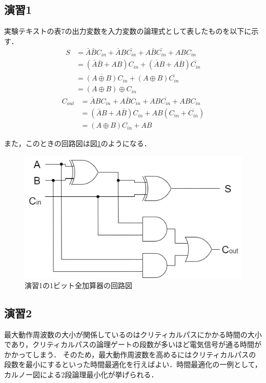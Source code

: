 \documentclass{jlreq}
\numberwithin{equation}{section}
\begin{document}
\subsection{演習1}
実験テキストの表7の出力変数を入力変数の論理式として表したものを以下に示す．
\begin{align}
  S & = \bar{A} \bar{B} C_{in} + \bar{A} B \bar{C_{in}} + A \bar{B} \bar{C_{in}} + A B C_{in} \\
    & = (\bar{A}\bar{B} + AB)C_{in} + (\overline{A}B + A\overline{B})\overline{C_{in}}        \\
    & = \overline{(A \oplus B)}C_{in} + (A \oplus B)\overline{C_{in}}                         \\
    & = (A \oplus B) \oplus C_{in}
\end{align}
\begin{align}
  C_{out} & = \bar{A} B C_{in} + A \bar{B} C_{in} + A B \overline{C_{in}} + A B C_{in} \\
          & = (\bar{A} B + A \bar{B})C_{in} + AB(C_{in} + \overline{C_{in}})           \\
          & = (A \oplus B)C_{in} + AB
\end{align}

また，このときの回路図は図\ref{fig:enshu1}のようになる．
\begin{figure}[H]
  \centering
  \includegraphics[width=\textwidth]{assets/enshu1.png}
  \caption{演習1の1ビット全加算器の回路図}
  \label{fig:enshu1}
\end{figure}

\subsection{演習2}
最大動作周波数の大小が関係しているのはクリティカルパスにかかる時間の大小であり，クリティカルパスの論理ゲートの段数が多いほど電気信号が通る時間がかかってしまう．
そのため，最大動作周波数を高めるにはクリティカルパスの段数を最小にするといった時間最適化を行えばよい．時間最適化の一例として，カルノー図による2段論理最小化が挙げられる．\cite{logical_circuit_text}
\end{document}
